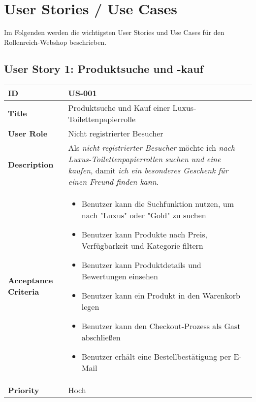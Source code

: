 \documentclass[a4paper,11pt]{article}
\begin{document}
\section{User Stories / Use Cases}
Im Folgenden werden die wichtigsten User Stories und Use Cases für den Rollenreich-Webshop beschrieben.

\subsection{User Story 1: Produktsuche und -kauf}
\begin{tabularx}{\textwidth}{|l|X|}
    \hline
    \textbf{ID} & US-001 \\
    \hline
    \textbf{Title} & Produktsuche und Kauf einer Luxus-Toilettenpapierrolle \\
    \hline
    \textbf{User Role} & Nicht registrierter Besucher \\
    \hline
    \textbf{Description} & Als \textit{nicht registrierter Besucher} möchte ich \textit{nach Luxus-Toilettenpapierrollen suchen und eine kaufen}, damit \textit{ich ein besonderes Geschenk für einen Freund finden kann}. \\
    \hline
    \textbf{Acceptance Criteria} & 
    \begin{itemize}
        \item Benutzer kann die Suchfunktion nutzen, um nach "Luxus" oder "Gold" zu suchen
        \item Benutzer kann Produkte nach Preis, Verfügbarkeit und Kategorie filtern
        \item Benutzer kann Produktdetails und Bewertungen einsehen
        \item Benutzer kann ein Produkt in den Warenkorb legen
        \item Benutzer kann den Checkout-Prozess als Gast abschließen
        \item Benutzer erhält eine Bestellbestätigung per E-Mail
    \end{itemize} \\
    \hline
    \textbf{Priority} & Hoch \\
    \hline
\end{tabularx}
\end{document}
